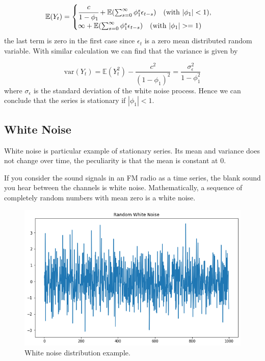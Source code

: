 \begin{equation}
\mathbb{E}(Y_t) =
\begin{cases}
\cfrac{c}{1-\phi_1} + \mathbb{E}(\sum_{s=0}^{\infty} \phi_1^s \epsilon_{t-s})\quad (\textrm{with } |\phi_1| < 1), \\
\infty + \mathbb{E}(\sum_{s=0}^{\infty} \phi_1^s \epsilon_{t-s})\quad (\textrm{with } |\phi_1| >= 1)
\end{cases}
\end{equation}
the last term is zero in the first case since \(\epsilon_t\) is a zero mean distributed random variable. With similar calculation we can find that the variance is given by

\begin{equation}
\textrm{var}(Y_t) = \mathbb{E}(Y_t^2) − \frac{c^2}{(1-\phi_1)^2} = \frac{\sigma_{\epsilon}^2}{1-\phi_1^2}
\end{equation}
where \(\sigma_{\epsilon}\) is the standard deviation of the white noise process. Hence we can conclude that the series is stationary if \(|\phi_1| < 1\).

\subsection{White Noise}\label{white-noise}

White noise is particular example of stationary series. Its mean and variance does not change over time, the peculiarity is that the mean is constant at 0.

If you consider the sound signals in an FM radio as a time series, the blank sound you hear between the channels is white noise.
Mathematically, a sequence of completely random numbers with mean zero is a white noise.

\begin{figure}[htb]
	\centering
	\includegraphics[width=0.7\linewidth]{figures/white_noise.png}
	\caption{White noise distribution example.}
	\label{fig:white_noise}
\end{figure}

